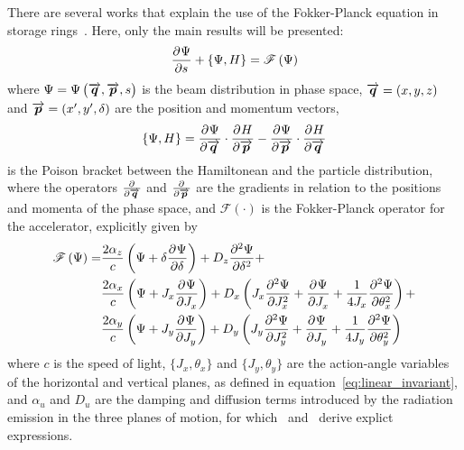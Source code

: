     There are several works that explain the use of the Fokker-Planck equation in storage rings~\cite{Lindberg2016,Suzuki1983,Suzuki1986,Lee1999,Wiedemann2007}. Here, only the main results will be presented:
    \begin{align}\label{eq:fokker_planck_equation}
        \derpar{\Psi}{s} + \poison{\Psi, H} = \mathscr{F}\funcof{\Psi}
    \end{align}
    where $\Psi = \Psi\funcof{\vect{q},\vect{p}, s}$ is the beam distribution in phase space, $\vect{q}=(x,y,z)$ and $\vect{p}=(x',y',\delta)$ are the position and momentum vectors,
    \begin{align}
        \poison{\Psi, H} = \derpar{\Psi}{\vect{q}}\cdot\derpar{H}{\vect{p}} -
                           \derpar{\Psi}{\vect{p}}\cdot\derpar{H}{\vect{q}}
    \end{align}
    is the Poison bracket between the Hamiltonean and the particle distribution, where the operators $\derpar{}{\vect{q}}$ and $\derpar{}{\vect{p}}$ are the gradients in relation to the positions and momenta of the phase space, and $\mathscr{F}(\cdot)$ is the Fokker-Planck operator for the accelerator, explicitly given by~\cite[eq. 33]{Lindberg2016}
    \begin{align}\nonumber
        \mathscr{F}\funcof{\Psi} = & \frac{2\alpha_z}{c}\funcof{
                                            \Psi + \delta\derpar{\Psi}{\delta}
                                      } + D_z \derpar[2]{\Psi}{\delta} + \\\nonumber
                                   & \frac{2\alpha_x}{c}\funcof{
                                         \Psi + J_x\derpar{\Psi}{J_x}
                                     } + D_x \funcof{J_x\derpar[2]{\Psi}{J_x} +
                                                 \derpar{\Psi}{J_x} +
                                                 \frac{1}{4J_x}\derpar[2]{\Psi}{\theta_x}
                                          } + \\
                                   & \frac{2\alpha_y}{c}\funcof{
                                        \Psi + J_y\derpar{\Psi}{J_y}
                                     } + D_y \funcof{J_y\derpar[2]{\Psi}{J_y} +
                                                 \derpar{\Psi}{J_y} +
                                                 \frac{1}{4J_y}\derpar[2]{\Psi}{\theta_y}
                                         }
    \end{align}
    where $c$ is the speed of light, $\{J_x, \theta_x\}$ and $\{J_y, \theta_y\}$ are the action-angle variables of the horizontal and vertical planes, as defined in equation~\eqref{eq:linear_invariant}, and $\alpha_u$ and $D_u$ are the damping and diffusion terms introduced by the radiation emission in the three planes of motion, for which~ and~ derive explict expressions.

